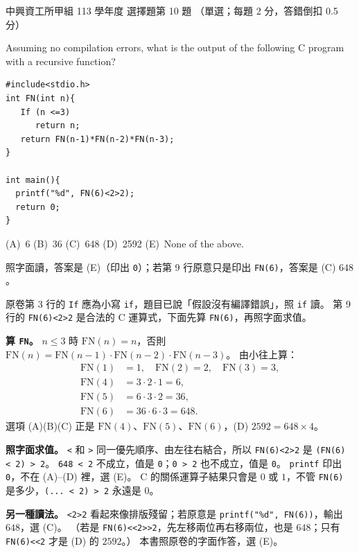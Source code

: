 \begin{pastexam}[label={px:nchu-113-dsa-10}]{中興資工所甲組 113 學年度 選擇題第 10 題}
（單選；每題 2 分，答錯倒扣 0.5 分）

Assuming no compilation errors, what is the output of the following C program with a recursive function?
\begin{verbatim}
#include<stdio.h>
int FN(int n){
   If (n <=3)
      return n;
   return FN(n-1)*FN(n-2)*FN(n-3);
}

int main(){
  printf("%d", FN(6)<2>2);
  return 0;
}
\end{verbatim}
(A)~6 \qquad (B)~36 \qquad (C)~648 \qquad (D)~2592 \qquad (E)~None of the above.
\end{pastexam}

\begin{pastsoln}
照字面讀，答案是 (E)（印出 \texttt{0}）；若第 9 行原意只是印出 \texttt{FN(6)}，答案是 (C) $648$。

原卷第 3 行的 \texttt{If} 應為小寫 \texttt{if}，題目已說「假設沒有編譯錯誤」，照 \texttt{if} 讀。 第 9 行的
\texttt{FN(6)<2>2} 是合法的 C 運算式，下面先算 \texttt{FN(6)}，再照字面求值。

\textbf{算 \texttt{FN}。} $n \le 3$ 時 $\mathrm{FN}(n) = n$，否則 $\mathrm{FN}(n) = \mathrm{FN}(n-1)\cdot\mathrm{FN}(n-2)
\cdot\mathrm{FN}(n-3)$。 由小往上算：
\[
\begin{aligned}
\mathrm{FN}(1) &= 1,\quad \mathrm{FN}(2) = 2,\quad \mathrm{FN}(3) = 3,\\
\mathrm{FN}(4) &= 3 \cdot 2 \cdot 1 = 6,\\
\mathrm{FN}(5) &= 6 \cdot 3 \cdot 2 = 36,\\
\mathrm{FN}(6) &= 36 \cdot 6 \cdot 3 = 648.
\end{aligned}
\]
選項 (A)(B)(C) 正是 $\mathrm{FN}(4)$、$\mathrm{FN}(5)$、$\mathrm{FN}(6)$，(D) $2592 = 648 \times 4$。

\textbf{照字面求值。} \texttt{<} 和 \texttt{>} 同一優先順序、由左往右結合，所以 \texttt{FN(6)<2>2} 是
\texttt{(FN(6) < 2) > 2}。 \texttt{648 < 2} 不成立，值是 \texttt{0}；\texttt{0 > 2} 也不成立，值是 \texttt{0}。
\texttt{printf} 印出 \texttt{0}，不在 (A)--(D) 裡，選 (E)。 C 的關係運算子結果只會是 $0$ 或 $1$，不管
\texttt{FN(6)} 是多少，\texttt{(... < 2) > 2} 永遠是 $0$。

\textbf{另一種讀法。} \texttt{<2>2} 看起來像排版殘留；若原意是 \texttt{printf("\%d", FN(6))}，輸出 $648$，選
(C)。 （若是 \texttt{FN(6)<<2>>2}，先左移兩位再右移兩位，也是 $648$；只有 \texttt{FN(6)<<2} 才是 (D) 的
$2592$。） 本書照原卷的字面作答，選 (E)。
\end{pastsoln}
